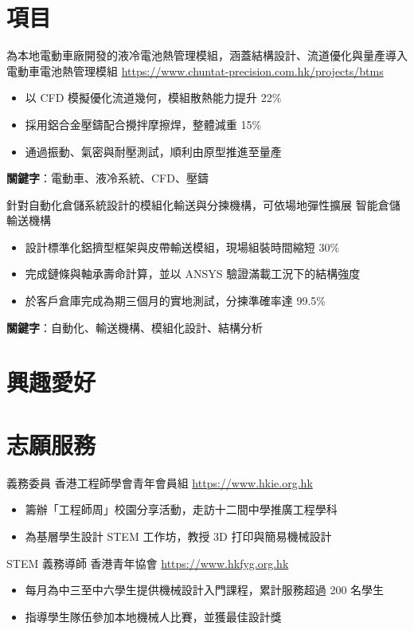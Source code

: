 \documentclass[a4paper, serif, 10pt]{moderncv}
\begin{document}
\section{項目}

        {為本地電動車廠開發的液冷電池熱管理模組，涵蓋結構設計、流道優化與量產導入}
        {電動車電池熱管理模組}
        {\url{https://www.chuntat-precision.com.hk/projects/btms}}
        {}
        {\begin{itemize}
\item 以 CFD 模擬優化流道幾何，模組散熱能力提升 22\%
\item 採用鋁合金壓鑄配合攪拌摩擦焊，整體減重 15\%
\item 通過振動、氣密與耐壓測試，順利由原型推進至量產
\end{itemize}
\textbf{關鍵字}：電動車、液冷系統、CFD、壓鑄}

        {針對自動化倉儲系統設計的模組化輸送與分揀機構，可依場地彈性擴展}
        {智能倉儲輸送機構}
        {}
        {}
        {\begin{itemize}
\item 設計標準化鋁擠型框架與皮帶輸送模組，現場組裝時間縮短 30\%
\item 完成鏈條與軸承壽命計算，並以 ANSYS 驗證滿載工況下的結構強度
\item 於客戶倉庫完成為期三個月的實地測試，分揀準確率達 99.5\%
\end{itemize}
\textbf{關鍵字}：自動化、輸送機構、模組化設計、結構分析}
\section{興趣愛好}

\section{志願服務}

        {義務委員}
        {香港工程師學會青年會員組}
        {\url{https://www.hkie.org.hk}}
        {}
        {\begin{itemize}
\item 籌辦「工程師周」校園分享活動，走訪十二間中學推廣工程學科
\item 為基層學生設計 STEM 工作坊，教授 3D 打印與簡易機械設計
\end{itemize}}
    

        {STEM 義務導師}
        {香港青年協會}
        {\url{https://www.hkfyg.org.hk}}
        {}
        {\begin{itemize}
\item 每月為中三至中六學生提供機械設計入門課程，累計服務超過 200 名學生
\item 指導學生隊伍參加本地機械人比賽，並獲最佳設計獎
\end{itemize}}
    
\end{document}
